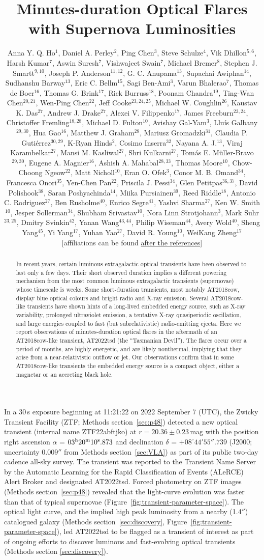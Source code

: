 \documentclass{nature_plusfigure}
\title{Minutes-duration Optical Flares with Supernova Luminosities}
\author{Anna Y. Q. Ho$^{1}$, Daniel A. Perley$^{2}$, Ping Chen$^{3}$, Steve Schulze$^{4}$, Vik Dhillon$^{5,6}$, Harsh Kumar$^{7}$, Aswin Suresh$^{7}$, Vishwajeet Swain$^{7}$, Michael Bremer$^{8}$, Stephen J. Smartt$^{9,10}$, Joseph P. Anderson$^{11,12}$, G. C. Anupama$^{13}$, Supachai Awiphan$^{14}$, Sudhanshu Barway$^{13}$, Eric C. Bellm$^{15}$, Sagi Ben-Ami$^{3}$, Varun Bhalerao$^{7}$, Thomas de Boer$^{16}$, Thomas G. Brink$^{17}$, Rick Burruss$^{18}$, Poonam Chandra$^{19}$, Ting-Wan Chen$^{20,21}$, Wen-Ping Chen$^{22}$, Jeff Cooke$^{23,24,25}$, Michael W. Coughlin$^{26}$, Kaustav K. Das$^{27}$, Andrew J. Drake$^{27}$, Alexei V. Filippenko$^{17}$, James Freeburn$^{23,24}$, Christoffer Fremling$^{18,28}$, Michael D. Fulton$^{10}$, Avishay Gal-Yam$^{3}$, Llu\'is Galbany$^{29,30}$, Hua Gao$^{16}$, Matthew J. Graham$^{28}$, Mariusz Gromadzki$^{31}$, Claudia P. Guti\'errez$^{30,29}$, K-Ryan Hinds$^{2}$, Cosimo Inserra$^{32}$, Nayana A. J.$^{13}$, Viraj Karambelkar$^{27}$, Mansi M. Kasliwal$^{27}$, Shri Kulkarni$^{27}$, Tom\'as E. M\"uller-Bravo$^{29,30}$, Eugene A. Magnier$^{16}$, Ashish A. Mahabal$^{28,33}$, Thomas Moore$^{10}$, Chow-Choong Ngeow$^{22}$, Matt Nicholl$^{10}$, Eran O. Ofek$^{3}$, Conor M. B. Omand$^{34}$, Francesca Onori$^{35}$, Yen-Chen Pan$^{22}$, Priscila J. Pessi$^{34}$, Glen Petitpas$^{36,37}$, David Polishook$^{38}$, Saran Poshyachinda$^{14}$, Miika Pursiainen$^{39}$, Reed Riddle$^{18}$, Antonio C. Rodriguez$^{27}$, Ben Rusholme$^{40}$, Enrico Segre$^{41}$, Yashvi Sharma$^{27}$, Ken W. Smith$^{10}$, Jesper Sollerman$^{34}$, Shubham Srivastav$^{10}$, Nora Linn Strotjohann$^{3}$, Mark Suhr$^{23,25}$, Dmitry Svinkin$^{42}$, Yanan Wang$^{43,44}$, Philip Wiseman$^{44}$, Avery Wold$^{40}$, Sheng Yang$^{45}$, Yi Yang$^{17}$, Yuhan Yao$^{27}$, David R. Young$^{10}$, WeiKang Zheng$^{17}$
[affiliations can be found \hyperref[sec:affiliations]{after the references}]
	}
\begin{document}
\maketitle

\begin{abstract}

In recent years, certain luminous extragalactic optical transients have been observed to last only a few days\cite{Drout2014}. Their short observed duration implies a different powering mechanism from the most common luminous extragalactic transients (supernovae) whose timescale is weeks\cite{Kasen2017}. Some short-duration transients, most notably AT2018cow\cite{Prentice2018}, display blue optical colours and bright radio and X-ray emission\cite{Ho2023}. Several AT2018cow-like transients have shown hints of a long-lived embedded energy source\cite{Margutti2019}, such as X-ray variability\cite{RiveraSandoval2018,Yao2022},
prolonged ultraviolet emission\cite{Chen2023b}, a tentative X-ray quasiperiodic oscillation\cite{Pasham2021,Zhang2022}, and large energies coupled to fast (but subrelativistic) radio-emitting ejecta\cite{Ho2020_Koala,Coppejans2020}. Here we report observations of minutes-duration optical flares in the aftermath of an AT2018cow-like transient, AT2022tsd (the ``Tasmanian Devil''). The flares occur over a period of months, are highly energetic, and are likely nonthermal, implying that they arise from a near-relativistic outflow or jet. Our observations confirm that in some AT2018cow-like transients the embedded energy source is a compact object, either a magnetar or an accreting black hole.

\end{abstract}

In a 30\,s exposure beginning at 11:21:22 on 2022 September 7 (UTC), the Zwicky Transient Facility (ZTF; Methods section~\ref{sec:p48}) detected a new optical transient (internal name ZTF22abftjko) at $r=20.36\pm0.23\,$mag with the position right ascension $\alpha$ = $03^{\rm{h}}20^{\rm{m}}10^{\rm{s}}.873$ and declination $\delta$ = $+08^{\circ} 44' 55''.739$ 
(J2000; uncertainty $0.009''$ from Methods section~\ref{sec:VLA}) as part of its public two-day cadence all-sky survey.
The transient was reported\cite{Munoz-Arancibia2022} to the Transient Name Server by the Automatic Learning for the Rapid Classification of Events (ALeRCE) Alert Broker\cite{Forster2021} and designated AT2022tsd.
Forced photometry on ZTF images (Methods section~\ref{sec:p48}) revealed that the light-curve evolution was faster than that of typical supernovae (Figure~\ref{fig:transient-parameter-space}).
The optical light curve, and the implied high peak luminosity from a nearby (1.4$''$) catalogued galaxy (Methods section~\ref{sec:discovery}, Figure~\ref{fig:transient-parameter-space}), led AT2022tsd to be flagged as a transient of interest as part of ongoing efforts to discover luminous and fast-evolving optical transients (Methods section \ref{sec:discovery}).
\end{document}
